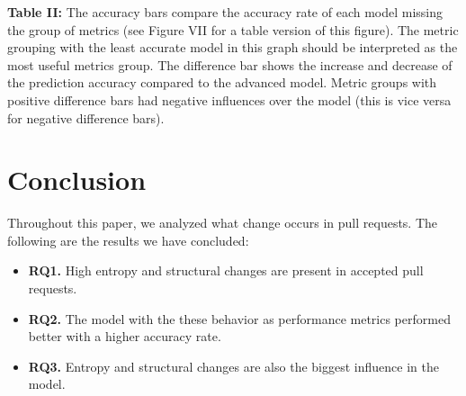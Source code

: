 \documentclass[10pt, conference]{IEEEtran}
\begin{document}
\newline \small \textbf{Table II:} The accuracy bars compare the accuracy rate of each model missing the group of metrics (see Figure VII for a table version of this figure). The metric grouping with the  least accurate model in this graph should be interpreted as the most useful metrics group. The difference bar shows the increase and decrease of the prediction accuracy compared to the advanced model. Metric groups with positive difference bars had negative influences over the model (this is vice versa for negative difference bars).


\section{Conclusion}
Throughout this paper, we analyzed what change occurs in pull requests. The following are the results we have concluded:

\begin{mdframed} 
\begin{itemize}
\item \textbf{RQ1.} High entropy and structural changes are present in accepted pull requests.
\item \textbf{RQ2.} The model with the these behavior as performance metrics performed better with a higher accuracy rate.
\item \textbf{RQ3.} Entropy and structural changes are also the biggest influence in the model.
\end{itemize}
\end{mdframed}
\end{document}
